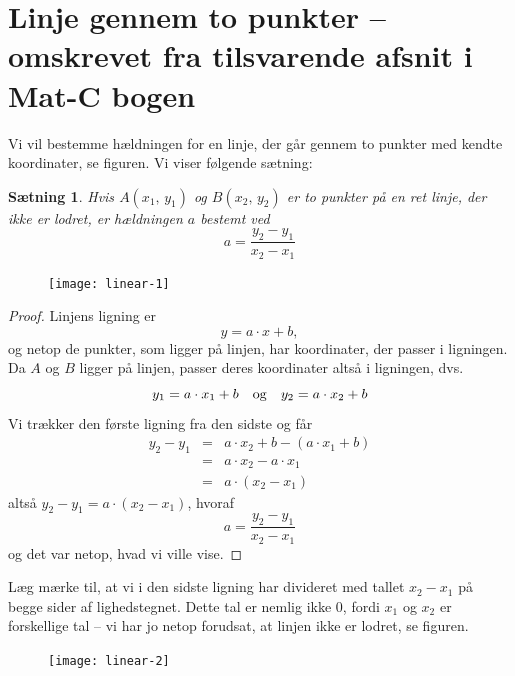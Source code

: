 \documentclass[12pt,oneside,a4paper]{article}
\newcommand{\bas}{\begin{eqnarray*}}
\newcommand{\eas}{\end{eqnarray*}}
\newtheorem{thm}{Sætning}[section]
\begin{document}
\section{Linje gennem to punkter -- omskrevet fra tilsvarende afsnit i Mat-C bogen}
Vi vil bestemme hældningen for en linje, der går gennem
to punkter med kendte koordinater, se figuren. Vi viser følgende sætning:
\begin{thm}
    Hvis $A(x_1,\,y_1)$ og $B(x_2,\,y_2)$ er to punkter på en ret linje, der ikke
    er lodret, er hældningen $a$ bestemt ved
    $$
    a = \frac{y_2-y_1}{x_2-x_1}
    $$
\end{thm}

\begin{figure}[ht]
    \centering
    \texttt{[image: linear-1]}
    \label{linear-1}
\end{figure}

\begin{proof}
    Linjens ligning er
    $$
    y = a\cdot x + b,
    $$
    og netop de punkter, som ligger på linjen, har koordinater, der passer i
    ligningen.  Da $A$ og $B$ ligger på linjen, passer deres koordinater altså
    i ligningen, dvs.
    $$
    y_1 = a\cdot x_1 + b \quad {\rm og} \quad y_2 = a\cdot x_2 + b 
    $$
    Vi trækker den første ligning fra den sidste og får
    \bas
    y_2 - y_1 &=& a\cdot x_2 + b - (a\cdot x_1 + b) \\
              &=& a\cdot x_2 - a\cdot x_1 \\
              &=& a\cdot \left(x_2-x_1\right) 
    \eas
    altså $y_2-y_1 = a \cdot \left(x_2-x_1\right)$, hvoraf
    $$
    a = \frac{y_2-y_1}{x_2-x_1}
    $$
    og det var netop, hvad vi ville vise.
\end{proof}

Læg mærke til, at vi i den sidste ligning har divideret med tallet $x_2-x_1$ på
begge sider af lighedstegnet. Dette tal er nemlig ikke $0$, fordi $x_1$ og
$x_2$ er forskellige tal -- vi har jo netop forudsat, at linjen ikke er lodret, se
figuren.

\begin{figure}[ht]
    \centering
    \texttt{[image: linear-2]}
    \label{linear-2}
\end{figure}
\end{document}
